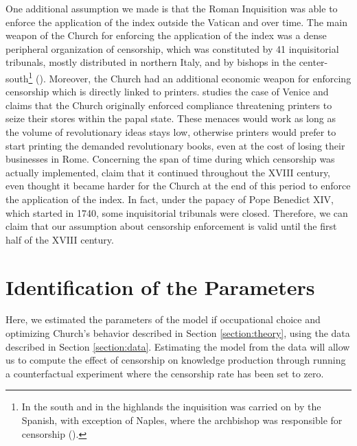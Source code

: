 \documentclass[12pt]{article}
\begin{document}
One additional assumption we made is that the Roman Inquisition was able to enforce the application of the index outside the Vatican and over time.
The main weapon of the Church for enforcing the application of the index was a dense peripheral organization of censorship, which was constituted by 41 inquisitorial tribunals, mostly distributed in northern Italy, and by bishops in the center-south\footnote{In the south and in the highlands the inquisition was carried on by the Spanish, with exception of Naples, where the archbishop was responsible for censorship ().} (). Moreover, the Church had an additional economic weapon for enforcing censorship which is directly linked to printers.  studies the case of Venice and claims that the Church originally enforced compliance threatening printers to seize their stores within the papal state. These menaces would work as long as the volume of revolutionary ideas stays low, otherwise printers would prefer to start printing the demanded revolutionary books, even at the cost of losing their businesses in Rome. Concerning the span of time during which censorship was actually implemented,  claim that it continued throughout the XVIII century, even thought it became harder for the Church at the end of this period to enforce the application of the index. In fact, under the papacy of Pope Benedict XIV, which started in 1740, some inquisitorial tribunals were closed. Therefore, we can claim that our assumption about censorship enforcement is valid until the first half of the XVIII century.

\section{Identification of the Parameters}\label{section:identification}

Here, we estimated the parameters of the model if occupational choice and optimizing Church's behavior described in Section \ref{section:theory}, using the data described in Section \ref{section:data}. Estimating the model from the data will allow us to compute the effect of censorship on knowledge production through running a counterfactual experiment where the censorship rate has been set to zero.
\end{document}
